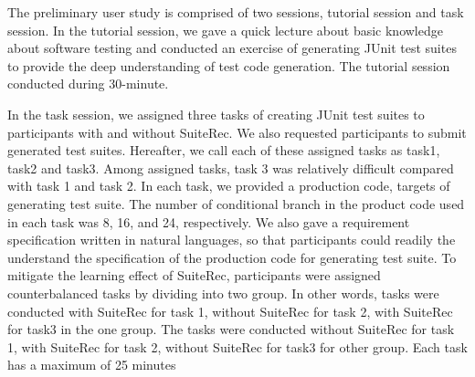 \documentclass[conference]{IEEEtran}
\begin{document}



The preliminary user study is comprised of two sessions, tutorial session and task session. 
In the tutorial session, we gave a quick lecture about basic knowledge about software testing and conducted an exercise of generating JUnit test suites to provide the deep understanding of test code generation. The tutorial session conducted during 30-minute.

In the task session, we assigned three tasks of creating JUnit test suites to participants with and without SuiteRec. We also requested participants to submit generated test suites. Hereafter, we call each of these assigned tasks as task1, task2 and task3.
Among assigned tasks, task 3 was relatively difficult  compared with task 1 and task 2.  In each task, we provided a production code, targets of generating test suite. The number of conditional branch in the product code used in each task was  8, 16, and 24, respectively. We also gave a requirement specification written in natural languages, so that participants could readily the understand  the specification of the production code for generating test suite.  To mitigate the learning effect of SuiteRec, participants were assigned counterbalanced tasks by dividing  into two group.  In other words, tasks were conducted with SuiteRec for task 1, without SuiteRec for task 2, with SuiteRec for task3 in the one group.  The tasks were conducted without SuiteRec for task 1, with SuiteRec for task 2, without SuiteRec for task3 for other group. Each task has a maximum of 25 minutes
\end{document}
